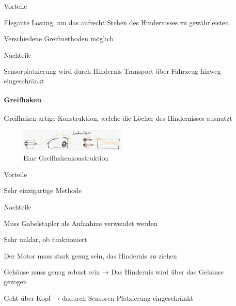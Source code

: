 \documentclass[../main.tex]{subfiles}
\begin{document}
\begin{minipage}[t]{0.48\textwidth}
    \begin{items}
          \item [Vorteile]
          \item Elegante Lösung, um das aufrecht Stehen des Hindernisses zu gewährleisten.
          \item Verschiedene Greifmethoden möglich
    \end{items}
\end{minipage}
\hfill
\begin{minipage}[t]{0.48\textwidth}
    \begin{items}
          \item [Nachteile]
          \item Sensorplatzierung wird durch Hindernis-Transport über Fahrzeug hinweg eingeschränkt
          
    \end{items}
\end{minipage}
\newpage
\paragraph{Greifhaken}
Greifhaken-artige Konstruktion, welche die Löcher des Hindernisses ausnutzt

\begin{figure}[h!]
        \centering
        \includegraphics[width=0.48\textwidth]{img/technologierecherche/Rotation/harponne.jpg}
        \caption{Eine Greifhakenkonstruktion}
        \label{img:tech_harponne}
\end{figure}

\begin{minipage}[t]{0.48\textwidth}
    \begin{items}
          \item [Vorteile]
          \item Sehr einzigartige Methode
    \end{items}
\end{minipage}
\hfill
\begin{minipage}[t]{0.48\textwidth}
    \begin{items}
          \item [Nachteile]
          \item Muss Gabelstapler als Aufnahme verwendet werden
          \item Sehr unklar, ob funktioniert
          \item Der Motor muss stark genug sein, das Hindernis zu ziehen
          \item Gehäuse muss genug robust sein → Das Hindernis wird über das Gehäuse gezogen
          \item Geht über Kopf → dadurch Sensoren Platzierung eingeschränkt
    \end{items}
\end{minipage}
\newpage
\end{document}

